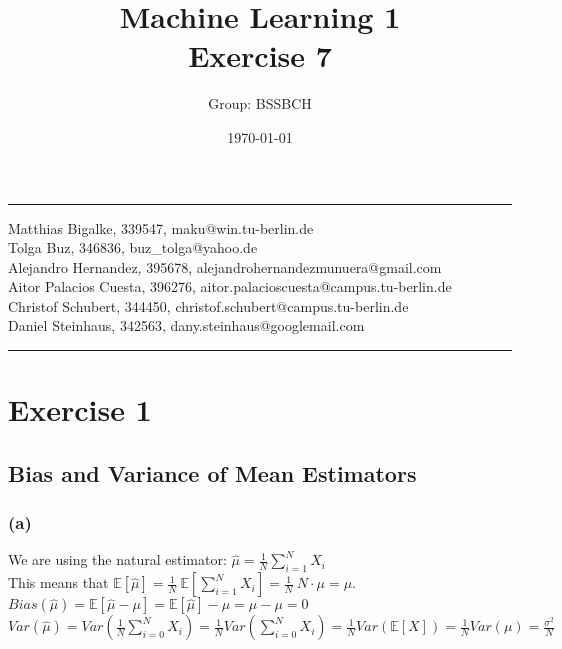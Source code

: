 \documentclass{article}
\title{Machine Learning 1 \\ Exercise 7} %
\author{Group: BSSBCH} %
\date{\today} %
\begin{document}
\maketitle %
\noindent\rule[0.5ex]{\linewidth}{1pt}
Matthias Bigalke, 339547, maku@win.tu-berlin.de \\
Tolga Buz, 346836, buz\_tolga@yahoo.de \\
Alejandro Hernandez, 395678, alejandrohernandezmunuera@gmail.com \\
Aitor Palacios Cuesta, 396276, aitor.palacioscuesta@campus.tu-berlin.de \\
Christof Schubert, 344450, christof.schubert@campus.tu-berlin.de \\
Daniel Steinhaus, 342563, dany.steinhaus@googlemail.com\\
\noindent\rule[0.5ex]{\linewidth}{1pt}


\section*{Exercise 1}

\subsection*{Bias and Variance of Mean Estimators}

\subsubsection*{(a)}
We are using the natural estimator: $\hat{\mu} = \frac{1}{N} \sum_{i=1}^N X_i$ \\

This means that $\mathbb{E}[\hat{\mu}]=\frac{1}{N}\ \mathbb{E}[\sum_{i=1}^N X_i]=\frac{1}{N}\ N \cdot \mu=\mu$. \\

$Bias(\hat{\mu})= \mathbb{E}[\hat{\mu} - \mu] = \mathbb{E}[\hat{\mu}] - \mu = \mu - \mu = 0$ \\

$Var(\hat{\mu})= Var(\frac{1}{N} \sum_{i=0}^N X_i) = \frac{1}{N} Var(\sum_{i=0}^N X_i)= \frac{1}{N} Var(\mathbb{E}[X]) = \frac{1}{N} Var(\mu) = \frac{\sigma^2}{N}$\\
\end{document}
